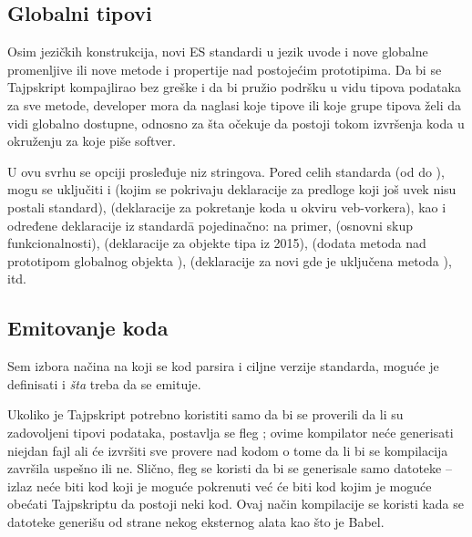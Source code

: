 \subsection{Globalni tipovi}

Osim jezičkih konstrukcija, novi ES standardi u jezik uvode i nove globalne promenljive ili nove metode i propertije nad postojećim prototipima.
Da bi se Tajpskript kompajlirao bez greške i da bi pružio podršku u vidu tipova podataka za sve metode, developer mora da naglasi koje tipove ili koje grupe tipova želi da vidi globalno dostupne, odnosno za šta očekuje da postoji tokom izvršenja koda u okruženju za koje piše softver.

U ovu svrhu se opciji  prosleđuje niz stringova.
Pored celih standarda (od  do ), mogu se uključiti i  (kojim se pokrivaju deklaracije za predloge koji još uvek nisu postali standard),  (deklaracije za pokretanje koda u okviru veb-vorkera), kao i određene deklaracije iz standard\=a pojedinačno: na primer,  (osnovni skup funkcionalnosti),  (deklaracije za objekte tipa  iz 2015),  (dodata metoda  nad prototipom globalnog objekta ),  (deklaracije za novi  gde je uključena metoda ), itd.

\subsection{Emitovanje koda}

Sem izbora načina na koji se kod parsira i ciljne verzije standarda, moguće je definisati i \textit{šta} treba da se emituje.

Ukoliko je Tajpskript potrebno koristiti samo da bi se proverili da li su zadovoljeni tipovi podataka, postavlja se fleg ; ovime kompilator neće generisati niejdan fajl ali će izvršiti sve provere nad kodom o tome da li bi se kompilacija završila uspešno ili ne.
Slično, fleg  se koristi da bi se generisale samo  datoteke -- izlaz neće biti kod koji je moguće pokrenuti već će biti kod kojim je moguće obećati Tajpskriptu da postoji neki kod.
Ovaj način kompilacije se koristi kada se  datoteke generišu od strane nekog eksternog alata kao što je Babel.

